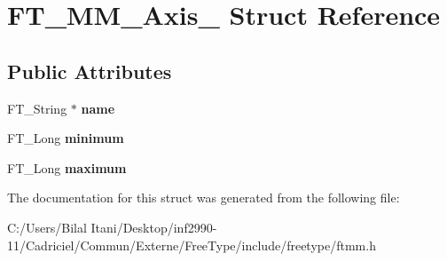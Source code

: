 \hypertarget{struct_f_t___m_m___axis__}{}\section{F\+T\+\_\+\+M\+M\+\_\+\+Axis\+\_\+ Struct Reference}
\label{struct_f_t___m_m___axis__}
\subsection*{Public Attributes}
\begin{DoxyCompactItemize}
\item 
F\+T\+\_\+\+String $\ast$ {\bfseries name}\hypertarget{struct_f_t___m_m___axis___a5c784efa44906c0e2b715eb1f866a09f}{}\label{struct_f_t___m_m___axis___a5c784efa44906c0e2b715eb1f866a09f}

\item 
F\+T\+\_\+\+Long {\bfseries minimum}\hypertarget{struct_f_t___m_m___axis___a9dc31f02b350b1356e0896673b5b73a4}{}\label{struct_f_t___m_m___axis___a9dc31f02b350b1356e0896673b5b73a4}

\item 
F\+T\+\_\+\+Long {\bfseries maximum}\hypertarget{struct_f_t___m_m___axis___addac1f8e71da1bedea9b393ae2751881}{}\label{struct_f_t___m_m___axis___addac1f8e71da1bedea9b393ae2751881}

\end{DoxyCompactItemize}


The documentation for this struct was generated from the following file\+:\begin{DoxyCompactItemize}
\item 
C\+:/\+Users/\+Bilal Itani/\+Desktop/inf2990-\/11/\+Cadriciel/\+Commun/\+Externe/\+Free\+Type/include/freetype/ftmm.\+h\end{DoxyCompactItemize}
